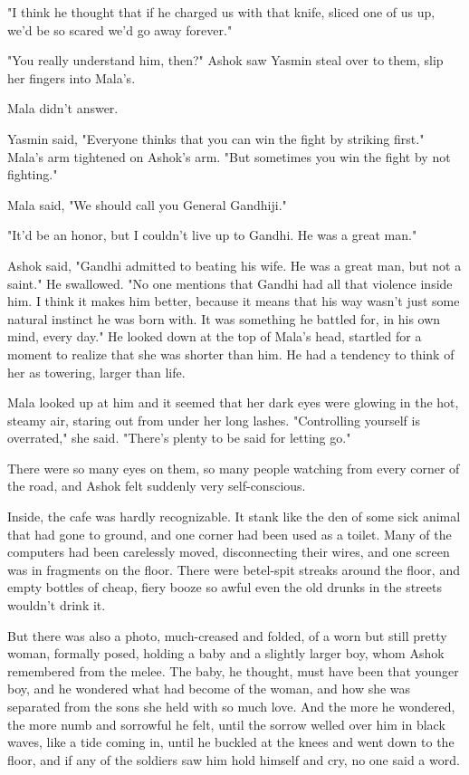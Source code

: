 "I think he thought that if he charged us with that knife, sliced
one of us up, we'd be so scared we'd go away forever."

"You really understand him, then?" Ashok saw Yasmin steal over to
them, slip her fingers into Mala's.

Mala didn't answer.

Yasmin said, "Everyone thinks that you can win the fight by
striking first." Mala's arm tightened on Ashok's arm. "But
sometimes you win the fight by not fighting."

Mala said, "We should call you General Gandhiji."

"It'd be an honor, but I couldn't live up to Gandhi. He was a great
man."

Ashok said, "Gandhi admitted to beating his wife. He was a great
man, but not a saint." He swallowed. "No one mentions that Gandhi
had all that violence inside him. I think it makes him better,
because it means that his way wasn't just some natural instinct he
was born with. It was something he battled for, in his own mind,
every day." He looked down at the top of Mala's head, startled for
a moment to realize that she was shorter than him. He had a
tendency to think of her as towering, larger than life.

Mala looked up at him and it seemed that her dark eyes were glowing
in the hot, steamy air, staring out from under her long lashes.
"Controlling yourself is overrated," she said. "There's plenty to
be said for letting go."

There were so many eyes on them, so many people watching from every
corner of the road, and Ashok felt suddenly very self-conscious.

Inside, the cafe was hardly recognizable. It stank like the den of
some sick animal that had gone to ground, and one corner had been
used as a toilet. Many of the computers had been carelessly moved,
disconnecting their wires, and one screen was in fragments on the
floor. There were betel-spit streaks around the floor, and empty
bottles of cheap, fiery booze so awful even the old drunks in the
streets wouldn't drink it.

But there was also a photo, much-creased and folded, of a worn but
still pretty woman, formally posed, holding a baby and a slightly
larger boy, whom Ashok remembered from the melee. The baby, he
thought, must have been that younger boy, and he wondered what had
become of the woman, and how she was separated from the sons she
held with so much love. And the more he wondered, the more numb and
sorrowful he felt, until the sorrow welled over him in black waves,
like a tide coming in, until he buckled at the knees and went down
to the floor, and if any of the soldiers saw him hold himself and
cry, no one said a word.

